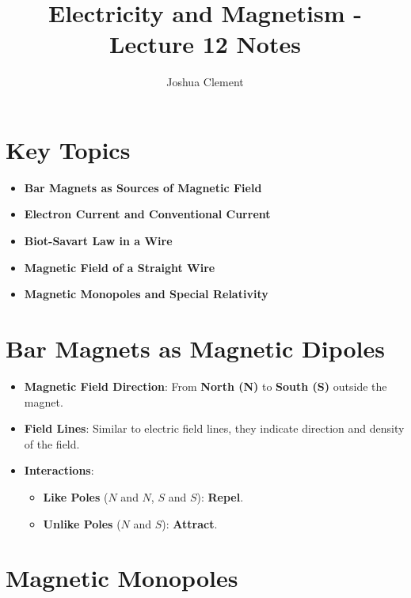 \documentclass{article}
\begin{document}
\title{Electricity and Magnetism - Lecture 12 Notes}
\author{Joshua Clement}
\maketitle

\section*{Key Topics}
\begin{itemize}
    \item \textbf{Bar Magnets as Sources of Magnetic Field}
    \item \textbf{Electron Current and Conventional Current}
    \item \textbf{Biot-Savart Law in a Wire}
    \item \textbf{Magnetic Field of a Straight Wire}
    \item \textbf{Magnetic Monopoles and Special Relativity}
\end{itemize}

\section*{Bar Magnets as Magnetic Dipoles}
\begin{itemize}
    \item \textbf{Magnetic Field Direction}: From \textbf{North (N)} to \textbf{South (S)} outside the magnet.
    \item \textbf{Field Lines}: Similar to electric field lines, they indicate direction and density of the field.
    \item \textbf{Interactions}:
    \begin{itemize}
        \item \textbf{Like Poles} (\(N\) and \(N\), \(S\) and \(S\)): \textbf{Repel}.
        \item \textbf{Unlike Poles} (\(N\) and \(S\)): \textbf{Attract}.
    \end{itemize}
\end{itemize}

\section*{Magnetic Monopoles}
\end{document}
